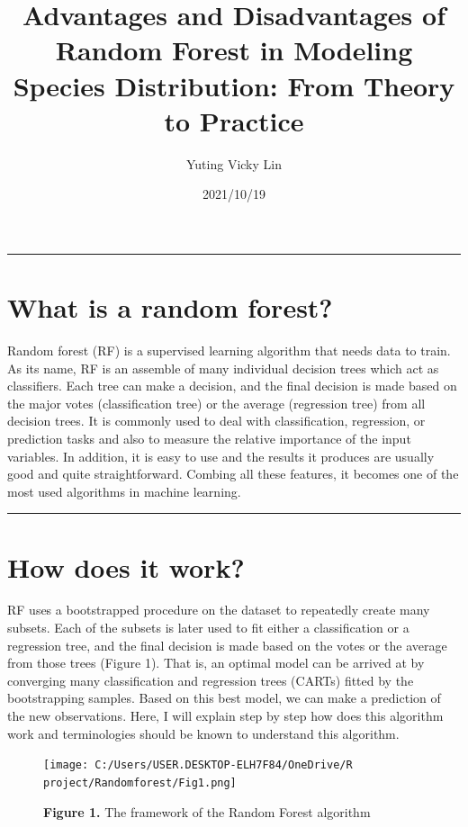 \documentclass[
]{article}
\title{Advantages and Disadvantages of Random Forest in Modeling Species
Distribution: From Theory to Practice}
\author{Yuting Vicky Lin}
\date{2021/10/19}
\begin{document}
\maketitle

{
\setcounter{tocdepth}{2}
\tableofcontents
}
\begin{center}\rule{0.5\linewidth}{0.5pt}\end{center}

\hypertarget{what-is-a-random-forest}{%
\section{What is a random forest?}\label{what-is-a-random-forest}}

Random forest (RF) is a supervised learning algorithm that needs data to
train. As its name, RF is an assemble of many individual decision trees
which act as classifiers. Each tree can make a decision, and the final
decision is made based on the major votes (classification tree) or the
average (regression tree) from all decision trees. It is commonly used
to deal with classification, regression, or prediction tasks and also to
measure the relative importance of the input variables. In addition, it
is easy to use and the results it produces are usually good and quite
straightforward. Combing all these features, it becomes one of the most
used algorithms in machine learning.

\begin{center}\rule{0.5\linewidth}{0.5pt}\end{center}

\hypertarget{how-does-it-work}{%
\section{How does it work?}\label{how-does-it-work}}

RF uses a bootstrapped procedure on the dataset to repeatedly create
many subsets. Each of the subsets is later used to fit either a
classification or a regression tree, and the final decision is made
based on the votes or the average from those trees (Figure 1). That is,
an optimal model can be arrived at by converging many classification and
regression trees (CARTs) fitted by the bootstrapping samples. Based on
this best model, we can make a prediction of the new observations. Here,
I will explain step by step how does this algorithm work and
terminologies should be known to understand this algorithm.

\begin{figure}
\centering
\texttt{[image: C:/Users/USER.DESKTOP-ELH7F84/OneDrive/R project/Randomforest/Fig1.png]}
\caption{\textbf{Figure 1.} The framework of the Random Forest
algorithm}
\end{figure}
\end{document}
